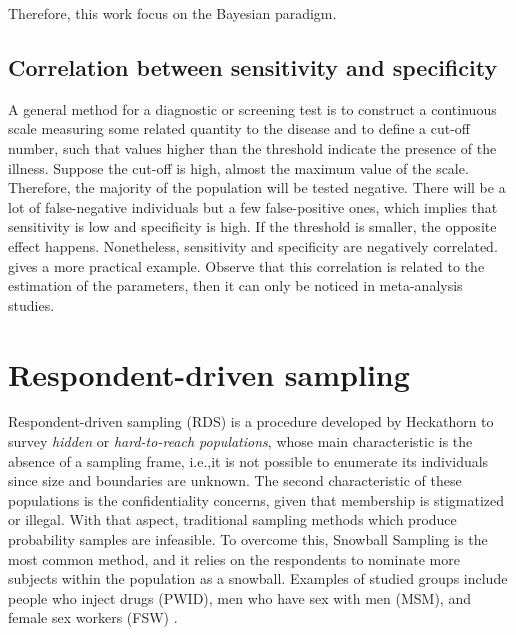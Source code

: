 Therefore, this work focus on the Bayesian paradigm. 

\subsection{Correlation between sensitivity and specificity}
\label{sec:correlation-sensitivity-specificity}

A general method for a diagnostic or screening test is to construct a
continuous scale measuring some related quantity to the disease and to define
a cut-off number, such that values higher than the threshold indicate the
presence of the illness. Suppose the cut-off is high, almost the maximum value
of the scale. Therefore, the majority of the population will be tested
negative. There will be a lot of false-negative individuals but a few
false-positive ones, which implies that sensitivity is low and specificity is
high. If the threshold is smaller, the opposite effect happens. Nonetheless,
sensitivity and specificity are negatively correlated. \textcite[p.
46]{parikh2008understanding} gives a more practical example. Observe that this
correlation is related to the estimation of the parameters, then it can only
be noticed in meta-analysis studies. 

\section{Respondent-driven sampling}
\label{sec:respodent_driven_sampling}

Respondent-driven sampling (RDS) is a procedure developed by Heckathorn
\cite[]{heckathorn1997} to survey {\em hidden} or {\em hard-to-reach
populations}, whose main characteristic is the absence of a sampling frame,
i.e.,it is not possible to enumerate its individuals since size and boundaries
are unknown. The second characteristic of these populations is the
confidentiality concerns, given that membership is stigmatized or illegal.
With that aspect, traditional sampling methods which produce probability
samples are infeasible. To overcome this, Snowball Sampling \cite[]{goodman1961}
is the most common method, and it relies on the respondents to nominate more 
subjects within the population as a snowball. Examples of studied groups
include people who inject drugs (PWID), men who have sex with men (MSM), and
female sex workers (FSW) \cite[p. 66]{gile2018methods}. 

